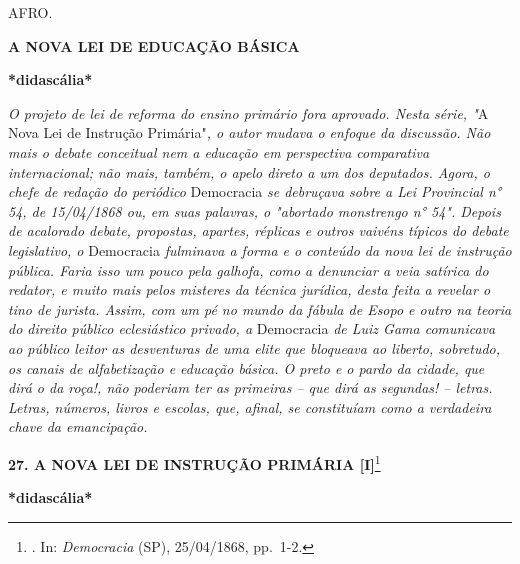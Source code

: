 AFRO.

\textbf{A NOVA LEI DE EDUCAÇÃO BÁSICA}

\textbf{*didascália*}

\emph{O projeto de lei de reforma do ensino primário fora aprovado.
Nesta série, "}A Nova Lei de Instrução Primária"\emph{, o autor mudava o
enfoque da discussão. Não mais o debate conceitual nem a educação em
perspectiva comparativa internacional; não mais, também, o apelo direto
a um dos deputados. Agora, o chefe de redação do periódico} Democracia
\emph{se debruçava sobre a Lei Provincial n° 54, de 15/04/1868 ou, em
suas palavras, o "abortado monstrengo n° 54". Depois de acalorado
debate, propostas, apartes, réplicas e outros vaivéns típicos do debate
legislativo, o} Democracia \emph{fulminava a forma e o conteúdo da nova
lei de instrução pública. Faria isso um pouco pela galhofa, como a
denunciar a veia satírica do redator, e muito mais pelos misteres da
técnica jurídica, desta feita a revelar o tino de jurista. Assim, com um
pé no mundo da fábula de Esopo e outro na teoria do direito público
eclesiástico privado, a} Democracia \emph{de Luiz Gama comunicava ao
público leitor as desventuras de uma elite que bloqueava ao liberto,
sobretudo, os canais de alfabetização e educação básica. O preto e o
pardo da cidade, que dirá o da roça!, não poderiam ter as primeiras --
que dirá as segundas! -- letras. Letras, números, livros e escolas, que,
afinal, se constituíam como a verdadeira chave da emancipação.}

\textbf{27. A NOVA LEI DE INSTRUÇÃO PRIMÁRIA {[}I{]}}\footnote{. In:
  \emph{Democracia} (SP), 25/04/1868, pp.~1-2.}

\textbf{*didascália*}

